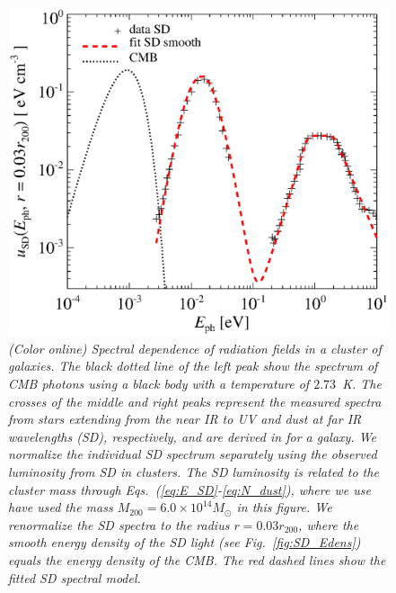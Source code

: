\documentclass[10pt,aps,pra,reprint,amsmath,amsfonts,amssymb,showpacs,nofootinbib,floatfix]{revtex4-1}
\newcommand{\msun}{M_\odot}
\newcommand{\rvir}{r_{200}}
\newcommand{\mvir}{M_{200}}
\begin{document}
\begin{figure}%
 \includegraphics[width=0.99\columnwidth]{figures/fit.porter.v2.eps}
 \caption{\it (Color online) Spectral dependence of radiation fields
   in a cluster of galaxies. The black dotted line of the left peak
   show the spectrum of CMB photons using a black body with a
   temperature of $2.73$~K. The crosses of the middle and right peaks
   represent the measured spectra from stars extending from the near
   IR to UV and dust at far IR wavelengths (SD), respectively, and are
   derived in \protect \cite{2006ApJ...648L..29P} for a galaxy. We
   normalize the individual SD spectrum separately using the observed
   luminosity from SD in clusters. The SD luminosity is related to the
   cluster mass through Eqs.~(\ref{eq:E_SD}-\ref{eq:N_dust}), where we
   use have used the mass $\mvir=6.0\times10^{14}\msun$ in this
   figure. We renormalize the SD spectra to the radius $r=0.03\rvir$,
   where the smooth energy density of the SD light (see
   Fig.~\ref{fig:SD_Edens}) equals the energy density of the CMB. The
   red dashed lines show the fitted SD spectral model.}
 \label{fig:SD_spectra}
\end{figure}
\end{document}
